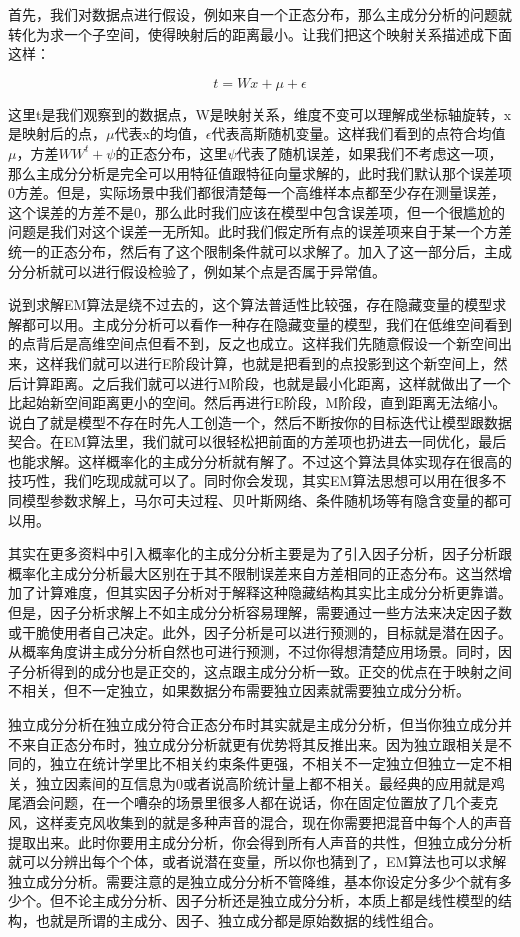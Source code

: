 \documentclass[]{tufte-book}
\begin{document}
首先，我们对数据点进行假设，例如来自一个正态分布，那么主成分分析的问题就转化为求一个子空间，使得映射后的距离最小。让我们把这个映射关系描述成下面这样：

\[
t = Wx + \mu + \epsilon
\]

这里t是我们观察到的数据点，W是映射关系，维度不变可以理解成坐标轴旋转，x是映射后的点，\(\mu\)代表x的均值，\(\epsilon\)代表高斯随机变量。这样我们看到的点符合均值\(\mu\)，方差\(WW^t + \psi\)的正态分布，这里\(\psi\)代表了随机误差，如果我们不考虑这一项，那么主成分分析是完全可以用特征值跟特征向量求解的，此时我们默认那个误差项0方差。但是，实际场景中我们都很清楚每一个高维样本点都至少存在测量误差，这个误差的方差不是0，那么此时我们应该在模型中包含误差项，但一个很尴尬的问题是我们对这个误差一无所知。此时我们假定所有点的误差项来自于某一个方差统一的正态分布，然后有了这个限制条件就可以求解了。加入了这一部分后，主成分分析就可以进行假设检验了，例如某个点是否属于异常值。

说到求解EM算法是绕不过去的，这个算法普适性比较强，存在隐藏变量的模型求解都可以用。主成分分析可以看作一种存在隐藏变量的模型，我们在低维空间看到的点背后是高维空间点但看不到，反之也成立。这样我们先随意假设一个新空间出来，这样我们就可以进行E阶段计算，也就是把看到的点投影到这个新空间上，然后计算距离。之后我们就可以进行M阶段，也就是最小化距离，这样就做出了一个比起始新空间距离更小的空间。然后再进行E阶段，M阶段，直到距离无法缩小。说白了就是模型不存在时先人工创造一个，然后不断按你的目标迭代让模型跟数据契合。在EM算法里，我们就可以很轻松把前面的方差项也扔进去一同优化，最后也能求解。这样概率化的主成分分析就有解了。不过这个算法具体实现存在很高的技巧性，我们吃现成就可以了。同时你会发现，其实EM算法思想可以用在很多不同模型参数求解上，马尔可夫过程、贝叶斯网络、条件随机场等有隐含变量的都可以用。

其实在更多资料中引入概率化的主成分分析主要是为了引入因子分析，因子分析跟概率化主成分分析最大区别在于其不限制误差来自方差相同的正态分布。这当然增加了计算难度，但其实因子分析对于解释这种隐藏结构其实比主成分分析更靠谱。但是，因子分析求解上不如主成分分析容易理解，需要通过一些方法来决定因子数或干脆使用者自己决定。此外，因子分析是可以进行预测的，目标就是潜在因子。从概率角度讲主成分分析自然也可进行预测，不过你得想清楚应用场景。同时，因子分析得到的成分也是正交的，这点跟主成分分析一致。正交的优点在于映射之间不相关，但不一定独立，如果数据分布需要独立因素就需要独立成分分析。

独立成分分析在独立成分符合正态分布时其实就是主成分分析，但当你独立成分并不来自正态分布时，独立成分分析就更有优势将其反推出来。因为独立跟相关是不同的，独立在统计学里比不相关约束条件更强，不相关不一定独立但独立一定不相关，独立因素间的互信息为0或者说高阶统计量上都不相关。最经典的应用就是鸡尾酒会问题，在一个嘈杂的场景里很多人都在说话，你在固定位置放了几个麦克风，这样麦克风收集到的就是多种声音的混合，现在你需要把混音中每个人的声音提取出来。此时你要用主成分分析，你会得到所有人声音的共性，但独立成分分析就可以分辨出每个个体，或者说潜在变量，所以你也猜到了，EM算法也可以求解独立成分分析。需要注意的是独立成分分析不管降维，基本你设定分多少个就有多少个。但不论主成分分析、因子分析还是独立成分分析，本质上都是线性模型的结构，也就是所谓的主成分、因子、独立成分都是原始数据的线性组合。
\end{document}
